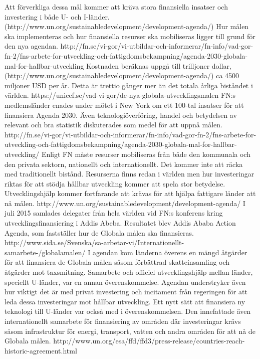 \documentclass{report}
\begin{document}
Att förverkliga dessa mål kommer att kräva stora finansiella insatser och  investering i både U- och I-länder. (http://www.un.org/sustainabledevelopment/development-agenda/)
Hur målen ska implementeras och hur finansiella resurser ska mobiliseras ligger till grund för den nya agendan. http://fn.se/vi-gor/vi-utbildar-och-informerar/fn-info/vad-gor-fn-2/fns-arbete-for-utveckling-och-fattigdomsbekampning/agenda-2030-globala-mal-for-hallbar-utveckling 
Kostnaden beräknas uppgå till trilljoner dollar, (http://www.un.org/sustainabledevelopment/development-agenda/) ca 4500 miljoner USD per år. Detta är trettio gånger mer än det totala årliga biståndet i världen.  https://unicef.se/vad-vi-gor/de-nya-globala-utvecklingsmalen FN:s medlemsländer enades under mötet i New York om ett 100-tal insatser för att finansiera Agenda 2030. Även teknologiöverföring, handel och betydelsen av relevant och bra statistik diskuterades som medel för att uppnå målen. http://fn.se/vi-gor/vi-utbildar-och-informerar/fn-info/vad-gor-fn-2/fns-arbete-for-utveckling-och-fattigdomsbekampning/agenda-2030-globala-mal-for-hallbar-utveckling/
Enligt FN måste resurser mobiliseras från både den kommunala och den privata sektorn, nationellt och internationellt. Det kommer inte att räcka med traditionellt bistånd. Resurserna finns redan i världen men hur investeringar riktas för att stödja hållbar utveckling kommer att spela stor betydelse. Utvecklingshjälp kommer fortfarande att krävas för att hjälpa fattigare länder att nå målen. 
http://www.un.org/sustainabledevelopment/development-agenda/
I juli 2015 samlades delegater från hela världen vid FN:s konferens kring utvecklingsfinansiering i Addis Abeba. Resultatet blev Addis Ababa Action Agenda, som fastställer hur de Globala målen ska finansieras.  http://www.sida.se/Svenska/sa-arbetar-vi/Internationellt-samarbete-/globalamalen/
I agendan kom länderna överens en mängd åtgärder för att finansiera de Globala målen såsom förbättrad skatteinsamling och åtgärder mot taxsmitning. Samarbete och officiel utvecklingshjälp mellan länder, speciellt U-länder, var en annan överenskommelse. Agendan understryker även hur viktigt det är med privat investering och incitament från regeringen för att leda dessa investeringar mot hållbar utveckling. Ett nytt sätt att finansiera ny teknologi till U-länder var också med i överenskommelsen. Den innefattade även internationellt samarbete för finansiering av områden där investeringar krävs såsom infrastruktur för energi, transport, vatten och andra områden för att nå de Globala målen.  
http://www.un.org/esa/ffd/ffd3/press-release/countries-reach-historic-agreement.html
\end{document}
